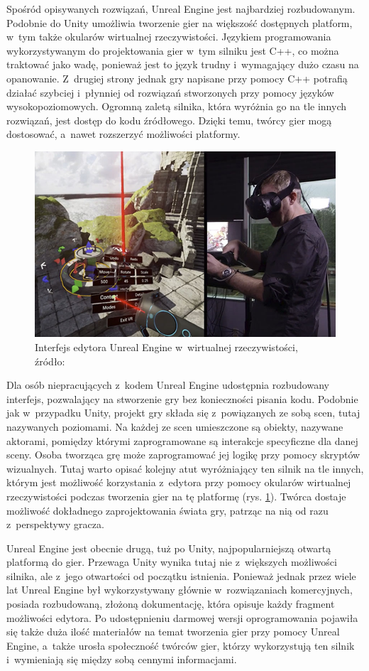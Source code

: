 Spośród opisywanych rozwiązań, Unreal Engine jest najbardziej rozbudowanym. Podobnie do Unity umożliwia tworzenie gier na większość dostępnych platform, w~tym także okularów wirtualnej rzeczywistości. Językiem programowania wykorzystywanym do projektowania gier w~tym silniku jest C++, co można traktować jako wadę, ponieważ jest to język trudny i~wymagający dużo czasu na opanowanie. Z~drugiej strony jednak gry napisane przy pomocy C++ potrafią działać szybciej i~płynniej od rozwiązań stworzonych przy pomocy języków wysokopoziomowych. Ogromną zaletą silnika, która wyróżnia go na tle innych rozwiązań, jest dostęp do kodu źródłowego. Dzięki temu, twórcy gier mogą dostosować, a~nawet rozszerzyć możliwości platformy. 

\begin{figure}
	\centering
	\includegraphics[width=0.7\linewidth]{images/unreal_vr_editor.jpg}
	\caption{Interfejs edytora Unreal Engine w~wirtualnej rzeczywistości, źródło:~\cite{unreal_manual}}
	\label{fig:unreal_vr_editor}
\end{figure}

Dla osób niepracujących z~kodem Unreal Engine udostępnia rozbudowany interfejs, pozwalający na stworzenie gry bez konieczności pisania kodu. Podobnie jak w~przypadku Unity, projekt gry składa się z~powiązanych ze sobą scen, tutaj nazywanych poziomami. Na każdej ze scen umieszczone są obiekty, nazywane aktorami, pomiędzy którymi zaprogramowane są interakcje specyficzne dla danej sceny. Osoba tworząca grę może zaprogramować jej logikę przy pomocy skryptów wizualnych. Tutaj warto opisać kolejny atut wyróżniający ten silnik na tle innych, którym jest możliwość korzystania z~edytora przy pomocy okularów wirtualnej rzeczywistości podczas tworzenia gier na tę platformę (rys. \ref{fig:unreal_vr_editor}). Twórca dostaje możliwość dokładnego zaprojektowania świata gry, patrząc na nią od razu z~perspektywy gracza. 

Unreal Engine jest obecnie drugą, tuż po Unity, najpopularniejszą otwartą platformą do gier. Przewaga Unity wynika tutaj nie z~większych możliwości silnika, ale z~jego otwartości od początku istnienia. Ponieważ jednak przez wiele lat Unreal Engine był wykorzystywany głównie w~rozwiązaniach komercyjnych, posiada rozbudowaną, złożoną dokumentację, która opisuje każdy fragment możliwości edytora. Po udostępnieniu darmowej wersji oprogramowania pojawiła się także duża ilość materiałów na temat tworzenia gier przy pomocy Unreal Engine, a~także urosła społeczność twórców gier, którzy wykorzystują ten silnik i~wymieniają się między sobą cennymi informacjami. 
